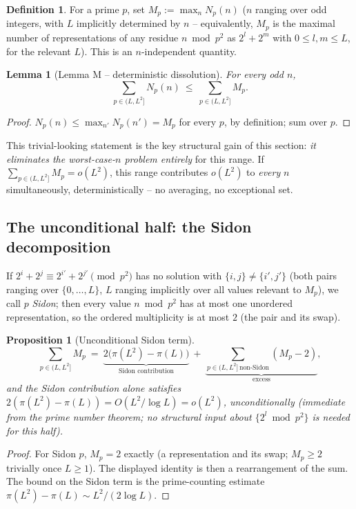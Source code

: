 \documentclass[11pt]{article}
\theoremstyle{plain}
\newtheorem{lemma}[theorem]{Lemma}
\newtheorem{proposition}[theorem]{Proposition}
\theoremstyle{definition}
\newtheorem{definition}[theorem]{Definition}
\theoremstyle{remark}
\begin{document}
\begin{definition}
For a prime $p$, set $M_p:=\max_{n}N_p(n)$ ($n$ ranging over odd integers,
with $L$ implicitly determined by $n$ -- equivalently, $M_p$ is the maximal
number of representations of any residue $n\bmod p^2$ as $2^l+2^m$ with
$0\le l,m\le L$, for the relevant $L$). This is an $n$-independent quantity.
\end{definition}

\begin{lemma}[Lemma M -- deterministic dissolution]\label{lem:M}
For \emph{every} odd $n$,
\[
\sum_{p\in(L,L^2]}N_p(n)\ \le\ \sum_{p\in(L,L^2]}M_p.
\]
\end{lemma}
\begin{proof}
$N_p(n)\le\max_{n'}N_p(n')=M_p$ for every $p$, by definition; sum over $p$.
\end{proof}

This trivial-looking statement is the key structural gain of this section:
\emph{it eliminates the worst-case-$n$ problem entirely} for this range. If
$\sum_{p\in(L,L^2]}M_p=o(L^2)$, this range contributes $o(L^2)$ to
\emph{every} $n$ simultaneously, deterministically -- no averaging, no
exceptional set.

\subsection{The unconditional half: the Sidon decomposition}

If $2^i+2^j\equiv2^{i'}+2^{j'}\pmod{p^2}$ has no solution with
$\{i,j\}\ne\{i',j'\}$ (both pairs ranging over $\{0,\dots,L\}$, $L$ ranging
implicitly over all values relevant to $M_p$), we call $p$ \emph{Sidon}; then
every value $n\bmod p^2$ has at most one unordered representation, so the
ordered multiplicity is at most $2$ (the pair and its swap).

\begin{proposition}[Unconditional Sidon term]\label{prop:sidonterm}
\[
\sum_{p\in(L,L^2]}M_p\ =\ \underbrace{2\bigl(\pi(L^2)-\pi(L)\bigr)}_{\text{Sidon contribution}}
\ +\ \underbrace{\sum_{p\in(L,L^2]\,\mathrm{non\text{-}Sidon}}(M_p-2)}_{\text{excess}},
\]
and the Sidon contribution alone satisfies
$2(\pi(L^2)-\pi(L))=O(L^2/\log L)=o(L^2)$, \emph{unconditionally} (immediate
from the prime number theorem; no structural input about $\{2^l\bmod p^2\}$
is needed for this half).
\end{proposition}
\begin{proof}
For Sidon $p$, $M_p=2$ exactly (a representation and its swap; $M_p\ge2$
trivially once $L\ge1$). The displayed identity is then a rearrangement of
the sum. The bound on the Sidon term is the prime-counting estimate
$\pi(L^2)-\pi(L)\sim L^2/(2\log L)$.
\end{proof}
\end{document}
